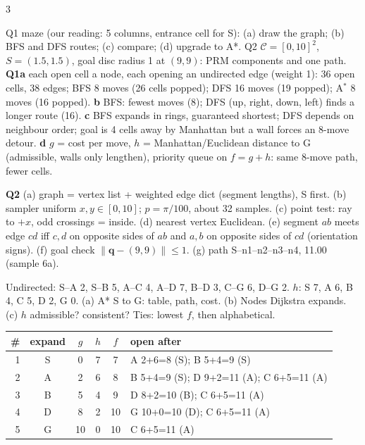 \begin{multicols}{3}
\begin{examq}
Q1 maze (our reading: 5 columns, entrance cell for S): (a) draw the graph; (b) BFS and DFS routes; (c) compare; (d) upgrade to A*. Q2 $\mathcal C=[0,10]^2$, $S=(1.5,1.5)$, goal disc radius 1 at $(9,9)$: PRM components and one path.
\solution
\textbf{Q1a} each open cell a node, each opening an undirected edge (weight 1): 36 open cells, 38 edges; BFS 8 moves (26 cells popped); DFS 16 moves (19 popped); A$^\ast$ 8 moves (16 popped). \textbf{b} BFS: fewest moves (8); DFS (up, right, down, left) finds a longer route (16). \textbf{c} BFS expands in rings, guaranteed shortest; DFS depends on neighbour order; goal is 4 cells away by Manhattan but a wall forces an 8-move detour. \textbf{d} $g$ = cost per move, $h$ = Manhattan/Euclidean distance to G (admissible, walls only lengthen), priority queue on $f=g+h$: same 8-move path, fewer cells.\par
\textbf{Q2} (a) graph = vertex list + weighted edge dict (segment lengths), S first. (b) sampler uniform $x,y\in[0,10]$; $p=\pi/100$, about 32 samples. (c) point test: ray to $+x$, odd crossings = inside. (d) nearest vertex Euclidean. (e) segment $ab$ meets edge $cd$ iff $c,d$ on opposite sides of $ab$ and $a,b$ on opposite sides of $cd$ (orientation signs). (f) goal check $\lVert\mathbf q-(9,9)\rVert\le1$. (g) path S--n1--n2--n3--n4, 11.00 (sample 6a). \chk
\end{examq}
\begin{examq}
Undirected: S--A 2, S--B 5, A--C 4, A--D 7, B--D 3, C--G 6, D--G 2. $h$: S 7, A 6, B 4, C 5, D 2, G 0. (a) A* S to G: table, path, cost. (b) Nodes Dijkstra expands. (c) $h$ admissible? consistent?
\solution
Ties: lowest $f$, then alphabetical.\par\vspace{1pt}
\scriptsize\setlength{\tabcolsep}{1.5pt}
\begin{tabularx}{\linewidth}{@{}rcccc>{\raggedright\arraybackslash}X@{}}\toprule
\# & expand & $g$ & $h$ & $f$ & open after\\\midrule
1 & S & 0 & 7 & 7 & A 2+6=8 (S); B 5+4=9 (S)\\
2 & A & 2 & 6 & 8 & B 5+4=9 (S); D 9+2=11 (A); C 6+5=11 (A)\\
3 & B & 5 & 4 & 9 & D 8+2=10 (B); C 6+5=11 (A)\\
4 & D & 8 & 2 & 10 & G 10+0=10 (D); C 6+5=11 (A)\\
5 & G & 10 & 0 & 10 & C 6+5=11 (A)\\

\end{tabularx}
\end{examq}
\end{multicols}
